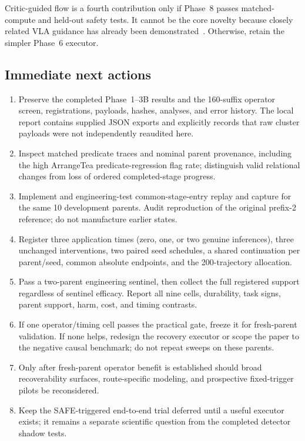 Critic-guided flow is a fourth contribution only if Phase~8 passes matched-compute and held-out safety tests. It cannot be the core novelty because closely related VLA guidance has already been demonstrated~\cite{qvgm,guidedactionflow}. Otherwise, retain the simpler Phase~6 executor.

\subsection{Immediate next actions}

\begin{enumerate}
  \item Preserve the completed Phase~1--3B results and the 160-suffix operator screen, registrations, payloads, hashes, analyses, and error history. The local report contains supplied JSON exports and explicitly records that raw cluster payloads were not independently reaudited here.
  \item Inspect matched predicate traces and nominal parent provenance, including the high ArrangeTea predicate-regression flag rate; distinguish valid relational changes from loss of ordered completed-stage progress.
  \item Implement and engineering-test common-stage-entry replay and capture for the same 10 development parents. Audit reproduction of the original prefix-2 reference; do not manufacture earlier states.
  \item Register three application times (zero, one, or two genuine inferences), three unchanged interventions, two paired seed schedules, a shared continuation per parent/seed, common absolute endpoints, and the 200-trajectory allocation.
  \item Pass a two-parent engineering sentinel, then collect the full registered support regardless of sentinel efficacy. Report all nine cells, durability, task signs, parent support, harm, cost, and timing contrasts.
  \item If one operator/timing cell passes the practical gate, freeze it for fresh-parent validation. If none helps, redesign the recovery executor or scope the paper to the negative causal benchmark; do not repeat sweeps on these parents.
  \item Only after fresh-parent operator benefit is established should broad recoverability surfaces, route-specific modeling, and prospective fixed-trigger pilots be reconsidered.
  \item Keep the SAFE-triggered end-to-end trial deferred until a useful executor exists; it remains a separate scientific question from the completed detector shadow tests.
\end{enumerate}

